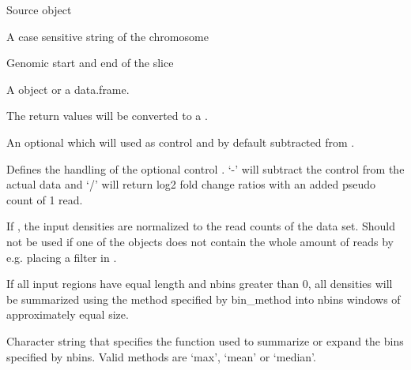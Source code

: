 \documentclass[letterpaper]{book}
\begin{document}
\begin{Arguments}
\begin{ldescription}
\item[\code{dc}] 
Source  object

\item[\code{chrom}] 
A case sensitive string of the chromosome

\item[\code{start}, \code{end}] 
Genomic start and end of the slice

\item[\code{ranges}] 
A  object or a data.frame. 
 
\item[\code{toRle}] 
The return values will be converted to a . 

\item[\code{control}] 
An optional  which will used as control and by default subtracted from .

\item[\code{input\_method}] 
Defines the handling of the optional control . `-' will subtract the control from the actual data and `/' will return log2 fold change ratios with an added pseudo count of 1 read.

\item[\code{treads\_norm}] 
If , the input densities are normalized to the read counts of the data set. Should not be used if one of the  objects does not contain the whole amount of reads by e.g. placing a filter in . 

\item[\code{nbins}] 
If all input regions have equal length and nbins greater than 0, all densities will be summarized using the method specified by bin\_method into nbins windows of approximately equal size. 

\item[\code{bin\_method}] 
Character string that specifies the function used to summarize or expand the bins specified by nbins. Valid methods are `max', `mean' or `median'.

\end{ldescription}
\end{Arguments}
%
\end{document}

